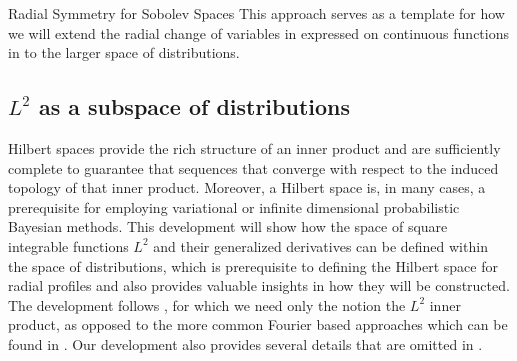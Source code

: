 \begin{chapter}{Radial Symmetry for Sobolev Spaces}
This approach serves as a template for how we will extend the radial change of variables in expressed on continuous functions in  to the larger space of distributions.

\subsection{$L^2$ as a subspace of distributions}

Hilbert spaces provide the rich structure of an inner product and are sufficiently complete to guarantee that sequences that converge with respect to the induced topology of that inner product.
Moreover, a Hilbert space is, in many cases, a prerequisite for employing variational or infinite dimensional probabilistic Bayesian methods.
This development will show how the space of square integrable functions $L^2$ and their generalized derivatives can be defined within the space of distributions, which is prerequisite to defining the Hilbert space for radial profiles and also provides valuable insights in how they will be constructed.
The development follows \citep{richtmyer1978principles}, for which we need only the notion the $L^2$ inner product, as opposed to the more common Fourier based approaches which can be found in \citep{rudin1991,hormander1983}.
Our development also provides several details that are omitted in \citep{richtmyer1978principles}. 


\end{chapter}
